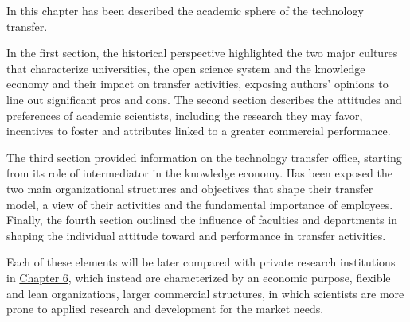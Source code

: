 In this chapter has been described the academic sphere of the technology transfer. 

In the first section, the historical perspective highlighted the two major cultures that characterize universities, the open science system and the knowledge economy and their impact on transfer activities, exposing authors' opinions to line out significant pros and cons. The second section describes the attitudes and preferences of academic scientists, including the research they may favor, incentives to foster and attributes linked to a greater commercial performance. 

The third section provided information on the technology transfer office, starting from its role of intermediator in the knowledge economy. Has been exposed the two main organizational structures and objectives that shape their transfer model, a view of their activities and the fundamental importance of employees. Finally, the fourth section outlined the influence of faculties and departments in shaping the individual attitude toward and performance in transfer activities.

Each of these elements will be later compared with private research institutions in \hyperref[Chapter6]{Chapter 6}, which instead are characterized by an economic purpose, flexible and lean organizations, larger commercial structures, in which scientists are more prone to applied research and development for the market needs.